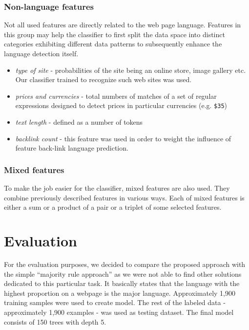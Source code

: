\documentclass{acm_proc_article-sp}
\begin{document}
{ \subsubsection{Non-language features}
    Not all used features are directly related to the web page language. Features in this group may help the
    classifier to first split the data space into distinct categories exhibiting different data patterns 
    to subsequently enhance the language detection itself.

    \begin{itemize}
      \item \textit{type of site} - probabilities of the site being an online store, image gallery etc.
      Our classifier trained to recognize such web sites was used.
      \item \textit{prices and currencies} - total numbers of matches of a set of regular
      expressions designed to detect prices in particular currencies (e.g. \texttt{\$35}) 
      \item \textit{text length} - defined as a number of tokens
      \item \textit{backlink count} - this feature was used in order to weight the influence of feature
      back-link language prediction.
    \end{itemize}

  \subsubsection{Mixed features}
    To make the job easier for the classifier, mixed features are also used. They combine previously
    described features in various ways. Each of mixed features is either a sum or a product of a
    pair or a triplet of some selected features. 

    \section{Evaluation}
 For the evaluation purposes, we decided to compare the proposed approach with the simple ``majority rule approach'' \cite{Martins:langidentweb} as we were 
 not able to find other solutions dedicated to this particular task. It basically states that the language with the highest proportion on a webpage
 is the major language. Approximately 1,900 training samples were used to create model. 
 The rest of the labeled data - approximately 1,900 examples - was used as testing dataset.
 The final model consists of 150 trees with depth 5.
 

}
\end{document}
